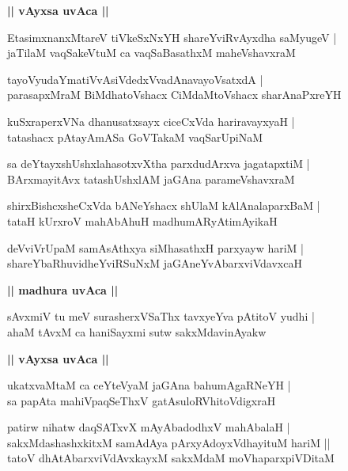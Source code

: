 \documentclass[twoside,12pt,openright]{book}
\newcounter{shloka}[chapter]
\def\uvaca#1{\centerline{{\large\textbf{#1}}}}
\begin{document}
\uvaca{ || vAyxsa uvAca ||}

\begin{shloka}%
EtasimxnanxMtareV tiVkeSxNxYH shareYviRvAyxdha saMyugeV |\\
jaTilaM vaqSakeVtuM ca vaqSaBasathxM maheVshavxraM 
\end{shloka}

\begin{shloka}%
tayoVyudaYmatiVvAsiVdedxVvadAnavayoVsatxdA |\\
parasapxMraM BiMdhatoVshacx CiMdaMtoVshacx sharAnaPxreYH
\end{shloka}

\begin{shloka}%
kuSxraperxVNa dhanusatxsayx ciceCxVda hariravayxyaH |\\
tatashacx pAtayAmASa GoVTakaM vaqSarUpiNaM
\end{shloka}

\begin{shloka}%
sa deYtayxshUshxlahasotxvXtha parxdudArxva jagatapxtiM |\\
BArxmayitAvx tatashUshxlAM jaGAna parameVshavxraM 
\end{shloka}

\begin{shloka}%
shirxBishcxsheCxVda bANeYshacx shUlaM kAlAnalaparxBaM |\\
tataH kUrxroV mahAbAhuH madhumARyAtimAyikaH 
\end{shloka}

\begin{shloka}%
deVviVrUpaM samAsAthxya siMhasathxH parxyayw hariM |\\
shareYbaRhuvidheYviRSuNxM jaGAneYvAbarxviVdavxcaH 
\end{shloka}

\uvaca{|| madhura uvAca ||}

\begin{shloka}%
sAvxmiV tu meV surasherxVSaThx tavxyeYva pAtitoV yudhi |\\
ahaM tAvxM ca haniSayxmi sutw sakxMdavinAyakw 
\end{shloka}

\uvaca{|| vAyxsa uvAca ||}

\begin{shloka}%
ukatxvaMtaM ca ceYteVyaM jaGAna bahumAgaRNeYH |\\
sa papAta mahiVpaqSeThxV gatAsuloRVhitoVdigxraH 
\end{shloka}

\begin{shloka}%
patirw nihatw daqSATxvX mAyAbadodhxV mahAbalaH |\\
sakxMdashashxkitxM samAdAya pArxyAdoyxVdhayituM hariM ||\\
tatoV dhAtAbarxviVdAvxkayxM sakxMdaM moVhaparxpiVDitaM 
\end{shloka}
\end{document}
